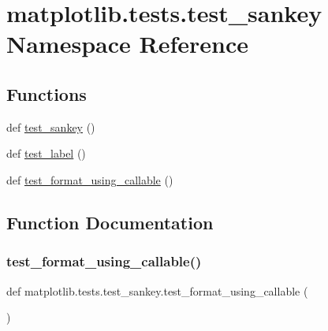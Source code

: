 \hypertarget{namespacematplotlib_1_1tests_1_1test__sankey}{}\section{matplotlib.\+tests.\+test\+\_\+sankey Namespace Reference}
\label{namespacematplotlib_1_1tests_1_1test__sankey}
\subsection*{Functions}
\begin{DoxyCompactItemize}
\item 
def \hyperlink{namespacematplotlib_1_1tests_1_1test__sankey_a1f2199579a60f44bfa7b4fdcf5995587}{test\+\_\+sankey} ()
\item 
def \hyperlink{namespacematplotlib_1_1tests_1_1test__sankey_af2a48236bb80df18fbaa2e0834457753}{test\+\_\+label} ()
\item 
def \hyperlink{namespacematplotlib_1_1tests_1_1test__sankey_aabf9ab28f2b4fb2f9f69965b3e18a976}{test\+\_\+format\+\_\+using\+\_\+callable} ()
\end{DoxyCompactItemize}


\subsection{Function Documentation}
\mbox{\label{namespacematplotlib_1_1tests_1_1test__sankey_aabf9ab28f2b4fb2f9f69965b3e18a976}} 
\subsubsection{\texorpdfstring{test\+\_\+format\+\_\+using\+\_\+callable()}{test\_format\_using\_callable()}}
{\footnotesize\ttfamily def matplotlib.\+tests.\+test\+\_\+sankey.\+test\+\_\+format\+\_\+using\+\_\+callable (\begin{DoxyParamCaption}{ }\end{DoxyParamCaption})}

\mbox{\label{namespacematplotlib_1_1tests_1_1test__sankey_af2a48236bb80df18fbaa2e0834457753}} 
